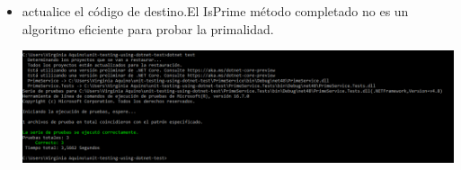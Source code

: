 \begin{itemize}
\begin{center}
\end{center} 
\item  actualice el código de destino.El IsPrime método completado no es un algoritmo eficiente para probar la primalidad.
\begin{center}
\includegraphics[width=\columnwidth]{images/final}\newline
\end{center} 
\end{itemize}


